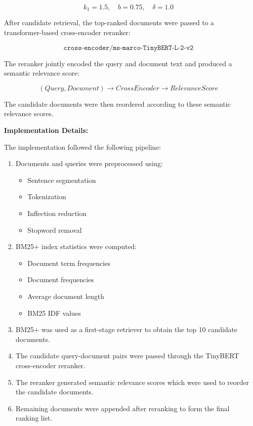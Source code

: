 \documentclass{article}
\begin{document}
\[
k_1 = 1.5, \quad b = 0.75, \quad \delta = 1.0
\]

After candidate retrieval, the top-ranked documents were passed to a transformer-based cross-encoder reranker:

\[
\texttt{cross-encoder/ms-marco-TinyBERT-L-2-v2}
\]

The reranker jointly encoded the query and document text and produced a semantic relevance score:

\[
(Query, Document) \rightarrow CrossEncoder \rightarrow RelevanceScore
\]

The candidate documents were then reordered according to these semantic relevance scores.

\textbf{Implementation Details:}

The implementation followed the following pipeline:

\begin{enumerate}
    \item Documents and queries were preprocessed using:
    \begin{itemize}
        \item Sentence segmentation
        \item Tokenization
        \item Inflection reduction
        \item Stopword removal
    \end{itemize}

    \item BM25+ index statistics were computed:
    \begin{itemize}
        \item Document term frequencies
        \item Document frequencies
        \item Average document length
        \item BM25 IDF values
    \end{itemize}

    \item BM25+ was used as a first-stage retriever to obtain the top 10 candidate documents.

    \item The candidate query-document pairs were passed through the TinyBERT cross-encoder reranker.

    \item The reranker generated semantic relevance scores which were used to reorder the candidate documents.

    \item Remaining documents were appended after reranking to form the final ranking list.
\end{enumerate}
\end{document}

